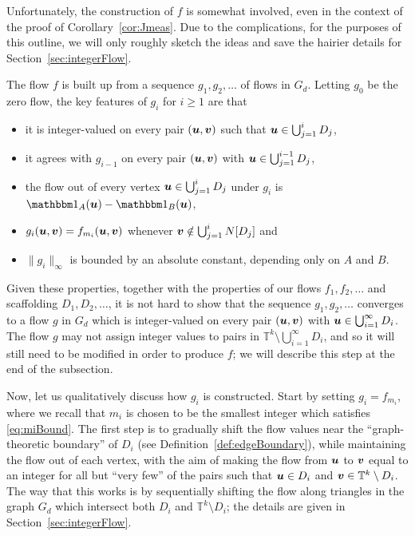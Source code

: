 \documentclass[12pt,a4paper]{amsart}
\numberwithin{equation}{section}
\theoremstyle{definition}
\begin{document}
Unfortunately, the construction of $f$ is somewhat involved, even in the context of the proof of Corollary~\ref{cor:Jmeas}. Due to the complications, for the purposes of this outline, we will only roughly sketch the ideas and save the hairier details for Section~\ref{sec:integerFlow}. 

The flow $f$ is built up from a sequence $g_1,g_2,\dots$ of flows in $G_d$. Letting $g_0$ be the zero flow, the key features of $g_i$ for $i\geq1$ are that
\begin{itemize}
\item it is integer-valued on every pair $(\boldsymbol{u},\boldsymbol{v})$ such that $\boldsymbol{u}\in\bigcup_{j=1}^iD_j$,
\item  it agrees with $g_{i-1}$ on every pair $(\boldsymbol{u},\boldsymbol{v})$ with $\boldsymbol{u}\in\bigcup_{j=1}^{i-1}D_j$,
\item the flow out of every vertex $\boldsymbol{u}\in \bigcup_{j=1}^iD_j$ under $g_i$ is $\ind_A(\vvec{u})-\ind_B(\vvec{u})$,
\item $g_i(\boldsymbol{u},\boldsymbol{v})=f_{m_i}(\boldsymbol{u},\boldsymbol{v})$ whenever $\boldsymbol{v}\notin \bigcup_{j=1}^iN[D_j]$ and
\item $\|g_i\|_\infty$ is bounded by an absolute constant, depending only on $A$ and $B$. 
\end{itemize}
Given these properties, together with the properties of our flows $f_1,f_2,\dots$ and scaffolding $D_1,D_2,\dots$, it is not hard to show that the sequence $g_1,g_2,\dots$ converges to a flow $g$ in $G_d$ which is integer-valued on every pair $(\boldsymbol{u},\boldsymbol{v})$ with $\boldsymbol{u}\in\bigcup_{i=1}^\infty D_i$. The flow $g$ may not assign integer values to pairs in $\mathbb{T}^k\setminus\bigcup_{i=1}^\infty D_i$, and so it will still need to be modified in order to produce $f$; we will describe this step at the end of the subsection.

Now, let us qualitatively discuss how $g_i$ is constructed. Start by setting $g_i=f_{m_i}$, where we recall that $m_i$ is chosen to be the smallest integer which satisfies \eqref{eq:miBound}. The first step is to gradually shift the flow values near the ``graph-theoretic boundary'' of $D_i$ (see Definition~\ref{def:edgeBoundary}), while maintaining the flow out of each vertex, with the aim of making the flow from $\boldsymbol{u}$ to $\boldsymbol{v}$ equal to an integer for all but ``very few'' of the pairs such that $\boldsymbol{u}\in D_i$ and $\boldsymbol{v}\in \mathbb{T}^k\setminus D_i$. The way that this works is by sequentially shifting the flow along triangles in the graph $G_d$ which intersect both $D_i$ and $\mathbb{T}^k\setminus D_i$; the details are given in Section~\ref{sec:integerFlow}. 
\end{document}
